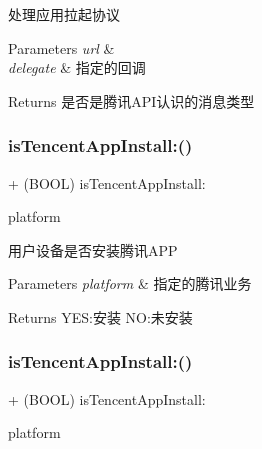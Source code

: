 处理应用拉起协议 
\begin{DoxyParams}{Parameters}
{\em url} & \\
\hline
{\em delegate} & 指定的回调 \\
\hline
\end{DoxyParams}
\begin{DoxyReturn}{Returns}
是否是腾讯\+A\+P\+I认识的消息类型 
\end{DoxyReturn}
\mbox{\label{interface_tencent_api_interface_ad336d33ff09293be98acb49a6509a9d0}} 
\subsubsection{\texorpdfstring{is\+Tencent\+App\+Install\+:()}{isTencentAppInstall:()}\hspace{0.1cm}{\footnotesize\ttfamily [1/2]}}
{\footnotesize\ttfamily + (B\+O\+OL) is\+Tencent\+App\+Install\+: \begin{DoxyParamCaption}\item[{(Tecnent\+Platform\+Type)}]{platform }\end{DoxyParamCaption}}

用户设备是否安装腾讯\+A\+PP 
\begin{DoxyParams}{Parameters}
{\em platform} & 指定的腾讯业务 \\
\hline
\end{DoxyParams}
\begin{DoxyReturn}{Returns}
Y\+ES\+:安装 NO\+:未安装 
\end{DoxyReturn}
\mbox{\label{interface_tencent_api_interface_ad336d33ff09293be98acb49a6509a9d0}} 
\subsubsection{\texorpdfstring{is\+Tencent\+App\+Install\+:()}{isTencentAppInstall:()}\hspace{0.1cm}{\footnotesize\ttfamily [2/2]}}
{\footnotesize\ttfamily + (B\+O\+OL) is\+Tencent\+App\+Install\+: \begin{DoxyParamCaption}\item[{(Tecnent\+Platform\+Type)}]{platform }\end{DoxyParamCaption}}

